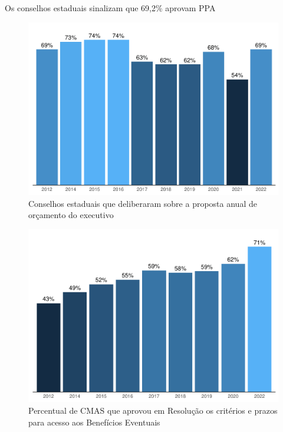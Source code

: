 \documentclass[
  brazilian]{report}
\begin{document}
Os conselhos estaduais sinalizam que 69,2\% aprovam PPA

\begin{figure}
\includegraphics{Censo-SUAS-2022_files/figure-latex/ceas-ppa-1} \caption[Conselhos estaduais que deliberaram sobre a proposta anual de orçamento do executivo]{Conselhos estaduais que deliberaram sobre a proposta anual de orçamento do executivo}\label{fig:ceas-ppa}
\end{figure}

\begin{figure}
\includegraphics{Censo-SUAS-2022_files/figure-latex/cmas-be-1} \caption[Percentual de CMAS que aprovou em Resolução os critérios e prazos para acesso aos Benefícios Eventuais]{Percentual de CMAS que aprovou em Resolução os critérios e prazos para acesso aos Benefícios Eventuais}\label{fig:cmas-be}
\end{figure}
\end{document}

